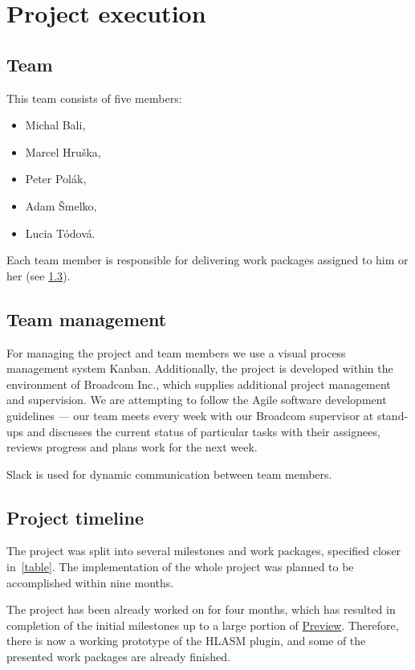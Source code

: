 \chapter{Project execution}

\section{Team}
This team consists of five members:

\begin{itemize}
	\item Michal Bali,
	\item Marcel Hruška,
	\item Peter Polák,
	\item Adam Šmelko,
	\item Lucia Tódová.
\end{itemize}

Each team member is responsible for delivering work packages assigned to him or her (see \cref{timeline}). 

\section{Team management} 

For managing the project and team members we use a visual process management system Kanban. Additionally, the project is developed within the environment of Broadcom Inc., which supplies additional project management and supervision. We are attempting to follow the Agile software development guidelines --- our team meets every week with our Broadcom supervisor at stand-ups and discusses the current status of particular tasks with their assignees, reviews progress and plans work for the next week. 

Slack is used for dynamic communication between team members.

\section{Project timeline}
\label{timeline}
The project was split into several milestones and work packages, specified closer in~\cref{table}. The implementation of the whole project was planned to be accomplished within nine months.

The project has been already worked on for four months, which has resulted in completion of the initial milestones up to a large portion of \hyperref[milestone_preview]{Preview}. Therefore, there is now a working prototype of the HLASM plugin, and some of the presented work packages are already finished.

